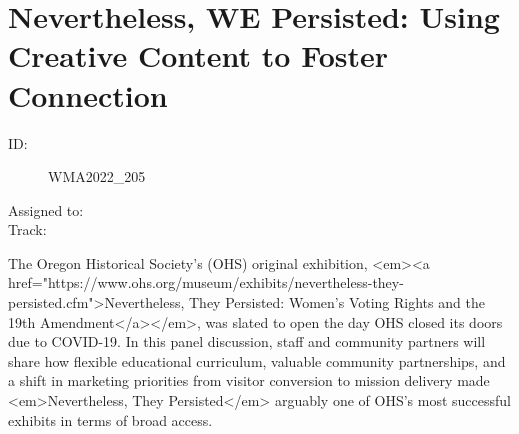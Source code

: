 \documentclass{report}
\begin{document}
              

              
        
          \newpage
          \section{ Nevertheless, WE Persisted: Using Creative Content to Foster Connection }
            \begin{description}
              \item [ID:]
              WMA2022\_205

              \item [Assigned to:]
                \item [Track:]
              \end{description}

              The Oregon Historical Society’s (OHS) original exhibition, <em><a href="https://www.ohs.org/museum/exhibits/nevertheless-they-persisted.cfm">Nevertheless, They Persisted: Women’s Voting Rights and the 19th Amendment</a></em>, was slated to open the day OHS closed its doors due to COVID-19. In this panel discussion, staff and community partners will share how flexible educational curriculum, valuable community partnerships, and a shift in marketing priorities from visitor conversion to mission delivery made <em>Nevertheless, They Persisted</em> arguably one of OHS’s most successful exhibits in terms of broad access. 
\end{document}
